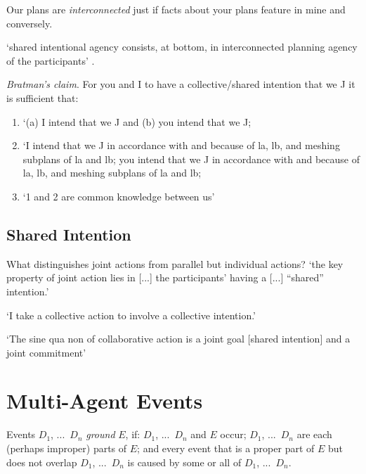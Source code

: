 \documentclass[12pt]{extarticle}
\begin{document}
\begin{multicols*}{3}
Our plans are \emph{interconnected} just if facts about your plans feature in mine and conversely.

‘shared intentional agency consists, at bottom, in interconnected planning agency of the participants’ \citep{Bratman:2011fk}.

\begin{minipage}{\columnwidth}

\emph{Bratman’s claim}. For you and I to have a collective/shared intention that we J it is sufficient that:

\begin{enumerate}[label=({\arabic*}),itemsep=0pt,topsep=0pt]

\item  `(a) I intend that we J and (b) you intend that we J;

\item `I intend that we J in accordance with and because of la, lb, and meshing subplans of la and lb; you intend that we J in accordance with and because of la, lb, and meshing subplans of la and lb;

\item `1 and 2 are common knowledge between us' \citep[View 4]{Bratman:1993je}

\end{enumerate}

\end{minipage}

\subsection{Shared Intention}

What distinguishes joint actions from parallel but individual actions?
‘the key property of joint action lies in [...] the participants’ having a [...] “shared” intention.’
\citep{alonso_shared_2009} %

`I take a collective action to involve a collective intention.'  \citep[p.\ 5]{Gilbert:2006wr}

`The sine qua non of collaborative action is a joint goal [shared intention] and a joint commitment’
\citep[p.\ 181]{tomasello:2008origins}



\section{Multi-Agent Events}
Events $D_1$, ...\ $D_n$ \emph{ground} $E$, if: $D_1$, ...\ $D_n$ and $E$ occur;
$D_1$, ...\ $D_n$ are each (perhaps improper) parts of $E$; and
every event that is a proper part of $E$ but does not overlap  $D_1$, ...\ $D_n$ is caused by some or all of $D_1$, ...\ $D_n$.


\end{multicols*}
\end{document}
